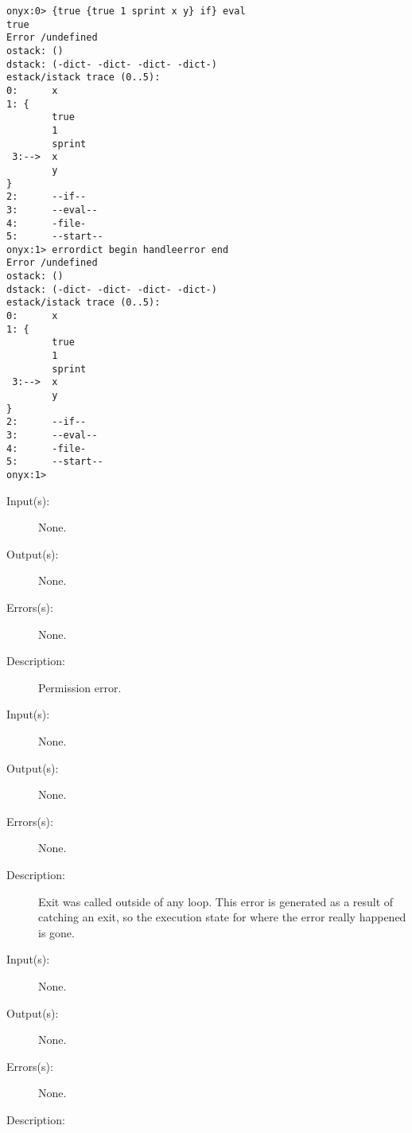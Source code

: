 \begin{description}
\begin{description}
\begin{verbatim}
onyx:0> {true {true 1 sprint x y} if} eval
true
Error /undefined
ostack: ()
dstack: (-dict- -dict- -dict- -dict-)
estack/istack trace (0..5):
0:      x
1: {
        true
        1
        sprint
 3:-->  x
        y
}
2:      --if--
3:      --eval--
4:      -file-
5:      --start--
onyx:1> errordict begin handleerror end
Error /undefined
ostack: ()
dstack: (-dict- -dict- -dict- -dict-)
estack/istack trace (0..5):
0:      x
1: {
        true
        1
        sprint
 3:-->  x
        y
}
2:      --if--
3:      --eval--
4:      -file-
5:      --start--
onyx:1>
		\end{verbatim}
	\end{description}
\label{invalidaccess}
\label{errordict:invalidaccess}
\item[{\onyxop{--}{invalidaccess}{--}}: ]
	\begin{description}\item[]
	\item[Input(s): ] None.
	\item[Output(s): ] None.
	\item[Errors(s): ] None.
	\item[Description: ]
		Permission error.
	\end{description}
\label{invalidexit}
\label{errordict:invalidexit}
\item[{\onyxop{--}{invalidexit}{--}}: ]
	\begin{description}\item[]
	\item[Input(s): ] None.
	\item[Output(s): ] None.
	\item[Errors(s): ] None.
	\item[Description: ]
		Exit was called outside of any loop.  This error is generated as
		a result of catching an exit, so the execution state for where
		the error really happened is gone.
	\end{description}
\label{invalidfileaccess}
\label{errordict:invalidfileaccess}
\item[{\onyxop{--}{invalidfileaccess}{--}}: ]
	\begin{description}\item[]
	\item[Input(s): ] None.
	\item[Output(s): ] None.
	\item[Errors(s): ] None.
	\item[Description: ]

\end{description}
\end{description}
